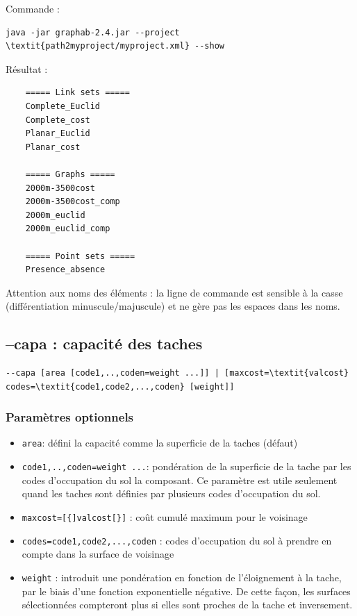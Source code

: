 \documentclass[a4paper,10pt]{report}
\begin{document}
Commande :
\begin{Verbatim}[commandchars=\\\{\}]
	java -jar graphab-2.4.jar --project \textit{path2myproject/myproject.xml} --show
\end{Verbatim}
Résultat :
\begin{Verbatim}
	===== Link sets =====
	Complete_Euclid
	Complete_cost
	Planar_Euclid
	Planar_cost
	
	===== Graphs =====
	2000m-3500cost
	2000m-3500cost_comp
	2000m_euclid
	2000m_euclid_comp
	
	===== Point sets =====
	Presence_absence
\end{Verbatim}
Attention aux noms des éléments : la ligne de commande est sensible à la casse (différentiation minuscule/majuscule) et ne gère pas les espaces dans les noms.

\subsection{--capa : capacité des taches}
\begin{Verbatim}[commandchars=\\\{\}]
--capa [area [code1,..,coden=weight ...]] | [maxcost=\textit{valcost} codes=\textit{code1,code2,...,coden} [weight]]
\end{Verbatim}

\subsubsection{Paramètres optionnels}
\begin{itemize}
	\item \verb|area|: défini la capacité comme la superficie de la taches (défaut)
	\item \verb|code1,..,coden=weight ...|: pondération de la superficie de la tache par les codes d'occupation du sol la composant. Ce paramètre est utile seulement quand les taches sont définies par plusieurs codes d'occupation du sol.
	\item \verb|maxcost=[{]valcost[}]| : coût cumulé maximum pour le voisinage
	\item \verb|codes=code1,code2,...,coden| : codes d'occupation du sol à prendre en compte dans la surface de voisinage
	\item \verb|weight| : introduit une pondération en fonction de l’éloignement à la tache, par le biais d’une fonction exponentielle négative. De cette façon, les surfaces sélectionnées compteront plus si elles sont proches de la tache et inversement.
\end{itemize}
\end{document}
